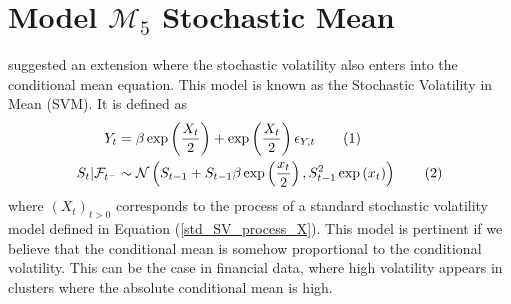 \documentclass[11pt,a4,twosided,singlespacing,titlepagenumber=on]{scrreprt}
\numberwithin{equation}{chapter} %
\theoremstyle{remark}
\newcommand\numberthis{\addtocounter{equation}{1}\tag{\theequation}}
\begin{document}
\section{Model $\mathcal{M}_5$ Stochastic Mean}
\cite{koopman2002} suggested an extension where the stochastic volatility also enters into the conditional mean equation. This model is known as the Stochastic Volatility in Mean (SVM). It is defined as
\begin{align*}
Y_t 			 &= \beta \exp\left(\frac{X_t}{2}\right) + \exp\left(\frac{X_t}{2}\right) \epsilon_{Y,t} \numberthis\\
S_t | \mathcal{F}_{t^-}  &\sim \mathcal{N} \left(S_{t-1} + S_{t-1} \beta \exp\left(\frac{x_t}{2}\right), S_{t-1}^2 \exp\left(x_t\right) \right) \numberthis
\end{align*}
where $(X_t)_{t>0}$ corresponds to the process of a standard stochastic volatility model defined in Equation (\ref{std_SV_process_X}). This model is pertinent if we believe that the conditional mean is somehow proportional to the conditional volatility. This can be the case in financial data, where high volatility appears in clusters where the absolute conditional mean is high.
\end{document}
